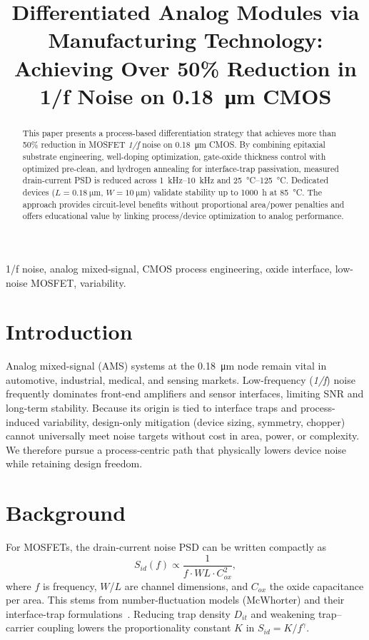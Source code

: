\documentclass[conference]{IEEEtran}
\title{Differentiated Analog Modules via Manufacturing Technology:\\
Achieving Over 50\% Reduction in 1/f Noise on 
\texorpdfstring{\SI{0.18}{\micro\meter}}{0.18 µm} CMOS}
\author{
\IEEEauthorblockN{Shinichi Samizo}
\IEEEauthorblockA{Independent Semiconductor Researcher\\
Project Design Hub, Samizo--AITL\\
\textit{Email:} \href{mailto:shin3t72@gmail.com}{shin3t72@gmail.com}\quad
\textit{GitHub:} \href{https://github.com/Samizo-AITL}{Samizo-AITL}}
}
\begin{document}
\maketitle

\begin{abstract}
This paper presents a process-based differentiation strategy that achieves more than 50\% reduction in MOSFET \emph{1/f} noise on \SI{0.18}{\micro\meter} CMOS. By combining epitaxial substrate engineering, well-doping optimization, gate-oxide thickness control with optimized pre-clean, and hydrogen annealing for interface-trap passivation, measured drain-current PSD is reduced across \SIrange{1}{10}{\kilo\hertz} and \SIrange{25}{125}{\celsius}. Dedicated devices ($L=\SI{0.18}{\micro\meter}$, $W=\SI{10}{\micro\meter}$) validate stability up to 1000~h at \SI{85}{\celsius}. The approach provides circuit-level benefits without proportional area/power penalties and offers educational value by linking process/device optimization to analog performance.
\end{abstract}

\begin{IEEEkeywords}
1/f noise, analog mixed-signal, CMOS process engineering, oxide interface, low-noise MOSFET, variability.
\end{IEEEkeywords}

\section{Introduction}
Analog mixed-signal (AMS) systems at the \SI{0.18}{\micro\meter} node remain vital in automotive, industrial, medical, and sensing markets. Low-frequency (\emph{1/f}) noise frequently dominates front-end amplifiers and sensor interfaces, limiting SNR and long-term stability. Because its origin is tied to interface traps and process-induced variability, design-only mitigation (device sizing, symmetry, chopper) cannot universally meet noise targets without cost in area, power, or complexity. We therefore pursue a process-centric path that physically lowers device noise while retaining design freedom.

\section{Background}
For MOSFETs, the drain-current noise PSD can be written compactly as
\begin{equation}
  S_{id}(f) \propto \frac{1}{f \cdot W L \cdot C_{ox}^{2}},
\end{equation}
where $f$ is frequency, $W$/$L$ are channel dimensions, and $C_{ox}$ the oxide capacitance per area. This stems from number-fluctuation models (McWhorter) and their interface-trap formulations~\cite{Takeda,Ghibaudo}. Reducing trap density $D_{it}$ and weakening trap--carrier coupling lowers the proportionality constant $K$ in $S_{id}=K/f^{\gamma}$.
\end{document}
